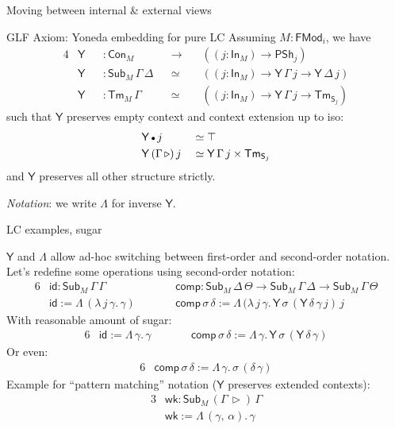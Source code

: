 \documentclass[dvipsnames,aspectratio=169]{beamer}
\newcommand{\ms}[1]{\mathsf{#1}}
\newcommand{\Con}{\mathsf{Con}}
\newcommand{\Sub}{\mathsf{Sub}}
\newcommand{\Tm}{\mathsf{Tm}}
\newcommand{\Y}{\mathsf{Y}}
\newcommand{\In}{\mathsf{In}}
\newcommand{\PSh}{\mathsf{PSh}}
\newcommand{\FMod}{\mathsf{FMod}}
\newcommand{\ext}{\triangleright}
\newcommand{\emptycon}{\scaleobj{.75}\bullet}
\renewcommand{\S}{\mathsf{S}}
\begin{document}
\begin{frame}{Moving between internal \& external views}

\begin{block}{GLF Axiom: Yoneda embedding for pure LC}
Assuming $M : \FMod_i$, we have
\begin{alignat*}{4}
  & \Y && : \Con_M                 &&\to\,  &&((j : \In_M) \to \PSh_j) \\
  & \Y && : \Sub_M\,\Gamma\,\Delta &&\simeq &&((j : \In_M) \to \Y\,\Gamma\,j \to \Y\,\Delta\,j)\\
  & \Y && : \Tm_M\,\Gamma          &&\simeq &&((j : \In_M) \to \Y\,\Gamma\,j \to \Tm_{\S_j})
\end{alignat*}
such that $\Y$ preserves empty context and context extension up to iso:
\begin{alignat*}{4}
  & \Y\,\emptycon\,j &&\simeq \top \\
  & \Y\,(\Gamma\,\ext)\,j &&\simeq \Y\,\Gamma\,j \times \Tm_{\S_j}
\end{alignat*}
and $\Y$ preserves all other structure strictly.
\end{block}
\emph{Notation}: we write $\Lambda$ for inverse $\Y$.
\end{frame}

\begin{frame}{LC examples, sugar}

$\Y$ and $\Lambda$ allow ad-hoc switching between first-order and second-order notation.
Let's redefine some operations using second-order notation:
\begin{alignat*}{6}
  & \ms{id} : \Sub_M\,\Gamma\,\Gamma && \ms{comp} : \Sub_M\,\Delta\,\Theta \to \Sub_M\,\Gamma\,\Delta \to \Sub_M\,\Gamma\,\Theta\\
  & \ms{id} := \Lambda\,(\lambda\,j\,\gamma.\,\gamma)\quad\quad && \ms{comp}\,\sigma\,\delta := \Lambda\,(\lambda\,j\,\gamma.\,\Y\,\sigma\,(\Y\,\delta\,\gamma\,j)\,j
\end{alignat*}
\pause
With reasonable amount of sugar:
\begin{alignat*}{6}
  & \ms{id} := \Lambda\,\gamma.\,\gamma\quad\quad && \ms{comp}\,\sigma\,\delta := \Lambda\,\gamma.\,\Y\,\sigma\,(\Y\,\delta\,\gamma)
\end{alignat*}
\pause
Or even:
\begin{alignat*}{6}
  &\ms{comp}\,\sigma\,\delta := \Lambda\,\gamma.\,\sigma\,(\delta\,\gamma)
\end{alignat*}
\pause
Example for ``pattern matching'' notation ($\Y$ preserves extended contexts):
\begin{alignat*}{3}
  & \ms{wk} : \Sub_M\,(\Gamma\,\ext)\,\Gamma \\
  & \ms{wk} := \Lambda\,(\gamma,\,\alpha).\,\gamma
\end{alignat*}

\end{frame}
\end{document}
